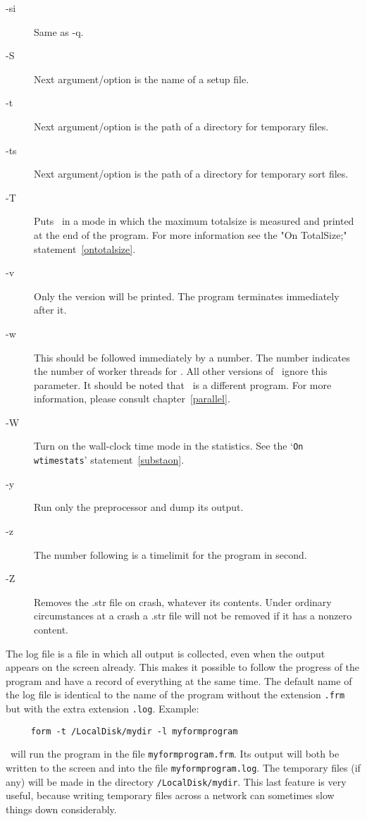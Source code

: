 \begin{description}
\item[-si] Same as -q.
\item[-S] Next argument/option is the name of a setup file.
\item[-t] Next argument/option is the path of a directory for temporary files.
\item[-ts] Next argument/option is the path of a directory for temporary sort 
     files.
\item[-T] Puts \FORM\ in a mode in which the maximum 
     totalsize is measured and printed at the end of the program. For more 
     information see the "On TotalSize;" statement~\ref{ontotalsize}.
\item[-v] Only the version will be printed. The program terminates 
     immediately after it.
\item[-w] This should be followed immediately by a number. The 
     number indicates the number of worker threads for \TFORM. All other 
     versions of \FORM\ ignore this parameter. It should be noted that \TFORM\ 
     is a different program. For more information, please consult 
     chapter~\ref{parallel}.
\item[-W] Turn on the wall-clock time mode in the statistics. 
     See the `\texttt{On wtimestats}' statement~\ref{substaon}.
\item[-y] Run only the preprocessor and dump its output.
\item[-z] The number following is a timelimit for the program in second.
\item[-Z] Removes the .str file on crash, whatever its contents. Under 
     ordinary circumstances at a crash a .str file will not be removed if 
     it has a nonzero content.
\end{description}

\noindent The log file is a file in which all 
output is collected, even when the output appears on the screen already. 
This makes it possible to follow the progress of the program and have a 
record of everything at the same time. The default name of the log file is 
identical to the name of the program without the extension \verb:.frm: but 
with the extra extension \verb:.log:.
Example:
\begin{center}
\begin{verbatim}
     form -t /LocalDisk/mydir -l myformprogram
\end{verbatim}
\end{center}
\FORM\ will run the program in the file \verb:myformprogram.frm:. Its output 
will both be written to the screen and into the file 
\verb:myformprogram.log:. The temporary files (if any) will be made in the 
directory \verb:/LocalDisk/mydir:. This last feature is very useful, 
because writing temporary files across a network can sometimes slow things 
down considerably.

